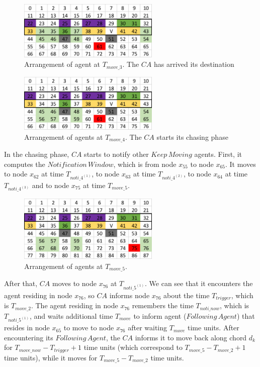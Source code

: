\begin{figure}[H]
  \centering  
  \includegraphics[width=0.6\textwidth]{figures/T611.png}
  \caption{Arrangement of agent at $T_{move\_3}$. The $CA$ has arrived its destination}\label{fig:T611}
\end{figure}

\begin{figure}[H]
  \centering  
  \includegraphics[width=0.6\textwidth]{figures/T612.png}
  \caption{Arrangement of agents at $T_{move\_4}$. The $CA$ starts its chasing phase}\label{fig:T612}
\end{figure}

In the chasing phase, $CA$ starts to notify other $Keep\,Moving$ agents. First, it computes the $Notification\,Window$,  which is from node $x_{55}$ to node $x_{65}$. It moves to node $x_{62}$ at time  $T_{noti\_4^{(1)}}$, to node $x_{63}$ at  time $T_{noti\_4^{(2)}}$, to node $x_{64}$ at  time $T_{noti\_4^{(3)}}$ and to node $x_{75}$ at time $T_{move\_5}$. 

\begin{figure}[H]
  \centering  
  \includegraphics[width=0.6\textwidth]{figures/T75.png}
  \caption{Arrangement of agents at $T_{move\_5}$. }\label{fig:T75}
\end{figure}
After that, $CA$ moves to node $x_{76}$ at $T_{noti\_5^{(1)}}$. We can see that it encounters the agent residing in node $x_{76}$, so $CA$ informs node $x_{76}$ about the time  $T_{trigger}$, which is $T_{move\_2}$. 
 The agent residing in node $x_{76}$   remembers the time $T_{noti\_now}$,  which is $T_{noti\_5^{(1)}}$, and waits additional time  $T_{move}$ to inform agent ($Following\,Agent$) that  resides in node $x_{65}$ to move to node $x_{76}$ after waiting $T_{move}$ time units.  After encountering its $Following\,Agent$, the $CA$ informs it to move back along chord $d_k$ for $T_{move\_now}-T_{trigger} +1$ time units (which correspond to  $T_{move\_5}- T_{move\_2}+1$ time units),  while it moves for $T_{move\_5}-T_{move\_2}$ time units. 

